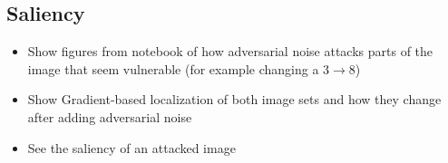 \pagebreak
    
\subsection{Saliency}
\begin{itemize}
    \item Show figures from notebook of how adversarial noise attacks parts of the image that seem vulnerable (for example changing a 3$\to$8)
    \item Show Gradient-based localization of both image sets and how they change after adding adversarial noise\cite{Selvaraju_2019}
    \item See the saliency of an attacked image
\end{itemize}
